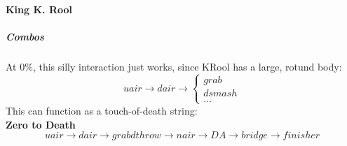 \paragraph{King K. Rool}

\subparagraph{Combos}
At $0\%$, this silly interaction just works, since KRool has a large, rotund body:
\[
	uair \to dair \to \begin{cases}
		grab	\\	dsmash	\\ \hdots
	\end{cases}
\]
This can function as a touch-of-death string:\\
\indent \textbf{Zero to Death}
\[
	uair \to dair \to grab dthrow \to nair \to DA \to bridge \to finisher
\]